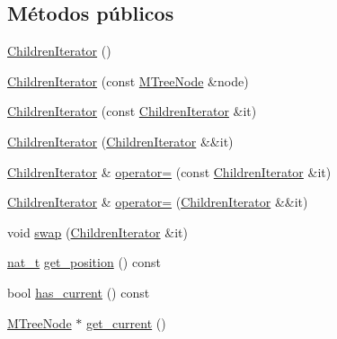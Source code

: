 \subsection*{Métodos públicos}
\begin{DoxyCompactItemize}
\item 
\hyperlink{class_designar_1_1_m_tree_node_1_1_children_iterator_ab050e655c7a557a50b2cdb390063e297}{Children\+Iterator} ()
\item 
\hyperlink{class_designar_1_1_m_tree_node_1_1_children_iterator_a1fdee49d713a9e2e007d59b996660e3e}{Children\+Iterator} (const \hyperlink{class_designar_1_1_m_tree_node}{M\+Tree\+Node} \&node)
\item 
\hyperlink{class_designar_1_1_m_tree_node_1_1_children_iterator_aceb65527a47a0e0105437cb032e76001}{Children\+Iterator} (const \hyperlink{class_designar_1_1_m_tree_node_1_1_children_iterator}{Children\+Iterator} \&it)
\item 
\hyperlink{class_designar_1_1_m_tree_node_1_1_children_iterator_ab43b11e8cdbc92ce79a5e44bcd74582e}{Children\+Iterator} (\hyperlink{class_designar_1_1_m_tree_node_1_1_children_iterator}{Children\+Iterator} \&\&it)
\item 
\hyperlink{class_designar_1_1_m_tree_node_1_1_children_iterator}{Children\+Iterator} \& \hyperlink{class_designar_1_1_m_tree_node_1_1_children_iterator_a1ddbcd1ae30de226e30e56ed6947c92a}{operator=} (const \hyperlink{class_designar_1_1_m_tree_node_1_1_children_iterator}{Children\+Iterator} \&it)
\item 
\hyperlink{class_designar_1_1_m_tree_node_1_1_children_iterator}{Children\+Iterator} \& \hyperlink{class_designar_1_1_m_tree_node_1_1_children_iterator_a61d6e5b6148ec6176ccc4b6ddbdda8a2}{operator=} (\hyperlink{class_designar_1_1_m_tree_node_1_1_children_iterator}{Children\+Iterator} \&\&it)
\item 
void \hyperlink{class_designar_1_1_m_tree_node_1_1_children_iterator_ac10d8a4f756973e74dd3c5c3224c6244}{swap} (\hyperlink{class_designar_1_1_m_tree_node_1_1_children_iterator}{Children\+Iterator} \&it)
\item 
\hyperlink{namespace_designar_aa72662848b9f4815e7bf31a7cf3e33d1}{nat\+\_\+t} \hyperlink{class_designar_1_1_m_tree_node_1_1_children_iterator_a0e1a9070e700ca1dbdbc5c588193dd54}{get\+\_\+position} () const
\item 
bool \hyperlink{class_designar_1_1_m_tree_node_1_1_children_iterator_a1ce8bf462bea3f6dc7ccf236839d0867}{has\+\_\+current} () const
\item 
\hyperlink{class_designar_1_1_m_tree_node}{M\+Tree\+Node} $\ast$ \hyperlink{class_designar_1_1_m_tree_node_1_1_children_iterator_a3ff90febfde4709c61d50107ce9761d5}{get\+\_\+current} ()

\end{DoxyCompactItemize}

